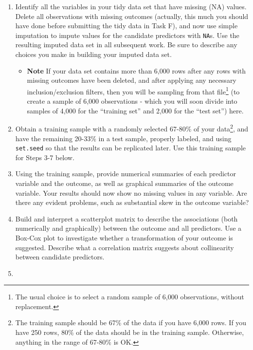 \documentclass[]{book}
\providecommand{\tightlist}{%
  \setlength{\itemsep}{0pt}\setlength{\parskip}{0pt}}
\let\rmarkdownfootnote\footnote%
\def\footnote{\protect\rmarkdownfootnote}
\theoremstyle{definition}
\theoremstyle{definition}
\theoremstyle{definition}
\theoremstyle{remark}
\begin{document}
\begin{enumerate}
\def\labelenumi{\arabic{enumi}.}
\tightlist
\item
  Identify all the variables in your tidy data set that have missing
  (NA) values. Delete all observations with missing outcomes (actually,
  this much you should have done before submitting the tidy data in Task
  F), and now use simple imputation to impute values for the candidate
  predictors with \texttt{NA}s. Use the resulting imputed data set in
  all subsequent work. Be sure to describe any choices you make in
  building your imputed data set.

  \begin{itemize}
  \tightlist
  \item
    \textbf{Note} If your data set contains more than 6,000 rows after
    any rows with missing outcomes have been deleted, and after applying
    any necessary inclusion/exclusion filters, then you will be sampling
    from that file\footnote{The usual choice is to select a random
      sample of 6,000 observations, without replacement.} (to create a
    sample of 6,000 observations - which you will soon divide into
    samples of 4,000 for the ``training set'' and 2,000 for the ``test
    set'') here.
  \end{itemize}
\item
  Obtain a training sample with a randomly selected 67-80\% of your
  data\footnote{The training sample should be 67\% of the data if you
    have 6,000 rows. If you have 250 rows, 80\% of the data should be in
    the training sample. Otherwise, anything in the range of 67-80\% is
    OK.}, and have the remaining 20-33\% in a test sample, properly
  labeled, and using \texttt{set.seed} so that the results can be
  replicated later. Use this training sample for Steps 3-7 below.
\item
  Using the training sample, provide numerical summaries of each
  predictor variable and the outcome, as well as graphical summaries of
  the outcome variable. Your results should now show no missing values
  in any variable. Are there any evident problems, such as substantial
  skew in the outcome variable?
\item
  Build and interpret a scatterplot matrix to describe the associations
  (both numerically and graphically) between the outcome and all
  predictors. Use a Box-Cox plot to investigate whether a transformation
  of your outcome is suggested. Describe what a correlation matrix
  suggests about collinearity between candidate predictors.
\item

\end{enumerate}
\end{document}

